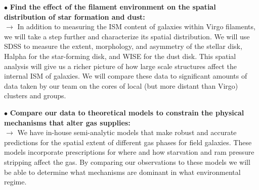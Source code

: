 \documentclass[11pt, preprint]{aastex}
\begin{document}
\noindent $\bullet$ \textbf{Find the effect of the filament
  environment on the spatial distribution of star formation and
  dust:}\\ $\rightarrow$
In addition to measuring the ISM content of galaxies within Virgo filaments, we will take a step further and characterize its spatial distribution. We will use SDSS to measure the extent, morphology, and asymmetry of the stellar disk, Halpha for the star-forming disk, and WISE for the dust disk. This spatial analysis will give us a richer picture of how large scale structures affect the internal ISM of galaxies. We will compare these data to significant amounts of data taken by our team on the cores of local (but more distant than Virgo) clusters and groups. 
  
\noindent $\bullet$ \textbf{Compare our data to theoretical models to
  constrain the physical mechanisms that alter gas supplies:}\\
$\rightarrow$ 
We have in-house semi-analytic models that make robust and accurate predictions for the spatial extent of different gas phases for field galaxies. These models incorporate prescriptions for where and how starvation and ram pressure stripping affect the gas. By comparing our observations to these models we will be able to determine what mechanisms are dominant in what environmental regime. 

\end{document}
